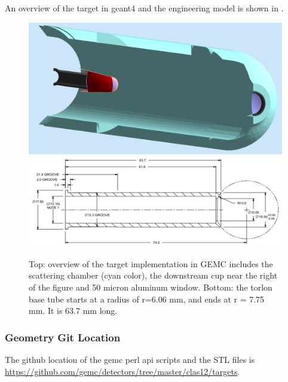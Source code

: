 An overview of the target in geant4 and the engineering model is shown in .

\begin{figure}
	\centering
	\includegraphics[width=0.95\columnwidth,keepaspectratio]{img/targetOverview1.png}
	\includegraphics[width=0.95\columnwidth,keepaspectratio]{img/targetOverview2.png}
	\caption{Top: overview of the target implementation in GEMC includes the scattering chamber (cyan color), the
            downstream cup near the right of the figure and 50 micron aluminum window. Bottom: the torlon base
            tube starts at a radius of r=6.06 mm, and ends at r = 7.75 mm. It is 63.7 mm long.}
	\label{fig:targetOverview}
\end{figure}

\subsubsection{Geometry Git Location}
The github location of the gemc perl api scripts and the STL files is \url{https://github.com/gemc/detectors/tree/master/clas12/targets}.





